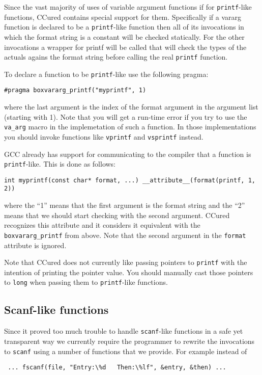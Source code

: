 \documentclass{book}
\def\t#1{{\tt #1}}
\begin{document}
 Since the vast majority of uses of variable argument functions if for
\t{printf}-like functions, CCured contains special support for them.
Specifically if a vararg function is declared to be a \t{printf}-like function
then all of its invocations in which the format string is a constant will be
checked statically. For the other invocations a wrapper for printf will be
called that will check the types of the actuals agains the format string
before calling the real \t{printf} function.

 To declare a function to be \t{printf}-like use the following pragma:
\begin{verbatim}
#pragma boxvararg_printf("myprintf", 1)
\end{verbatim}

 where the last argument is the index of the format argument in the argument
list (starting with 1). Note that you will get a run-time error if you try to
use the \t{va\_arg} macro in the implemetation of such a function. In those
implementations you should invoke functions like \t{vprintf} and \t{vsprintf}
instead.

 GCC already has support for communicating to the compiler that a function is
\t{printf}-like. This is done as follows:
\begin{verbatim}
int myprintf(const char* format, ...) __attribute__(format(printf, 1, 2))
\end{verbatim}
 
 where the ``1'' means that the first argument is the format string and the
``2'' means that we should start checking with the second argument. CCured
recognizes this attribute and it considers it equivalent with the
\t{boxvararg\_printf} from above. Note that the second argument in the
\t{format} attribute is ignored. 

 Note that CCured does not currently like passing pointers to \t{printf} with
the intention of printing the pointer value. You should manually cast those
pointers to \t{long} when passing them to \t{printf}-like functions.

    \subsection{Scanf-like functions}

 Since it proved too much trouble to handle \t{scanf}-like functions in a safe
yet transparent way we currently require the programmer to rewrite the
invocations to \t{scanf} using a number of functions that we provide. For
example instead of 
\begin{verbatim}
 ... fscanf(file, "Entry:\%d   Then:\%lf", &entry, &then) ...
\end{verbatim}
\end{document}
